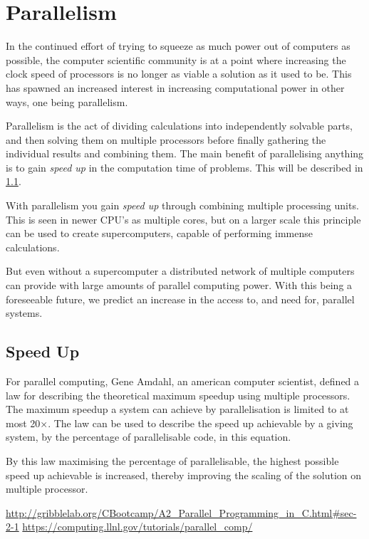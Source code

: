 \section{Parallelism}\label{sec:parallelism}

In the continued effort of trying to squeeze as much power out of computers as possible, the computer scientific community is at a point where increasing the clock speed of processors is no longer as viable a solution as it used to be. This has spawned an increased interest in increasing computational power in other ways, one being parallelism.

Parallelism is the act of dividing calculations into independently solvable parts, and then solving them on multiple processors before finally gathering the individual results and combining them. The main benefit of parallelising anything is to gain \emph{speed up} in the computation time of problems. This will be described in \cref{sup}.

With parallelism you gain \emph{speed up} through combining multiple processing units. This is seen in newer CPU's as multiple cores, but on a larger scale this principle can be used to create supercomputers, capable of performing immense calculations.

But even without a supercomputer a distributed network of multiple computers can provide with large amounts of parallel computing power. With this being a foreseeable future, we predict an increase in the access to, and need for, parallel systems.

\subsection{Speed Up}\label{sup}

For parallel computing, Gene Amdahl, an american computer scientist, defined a law for describing the theoretical maximum speedup using multiple processors. The maximum speedup a system can achieve by parallelisation is limited to at most 20×.
The law can be used to describe the speed up achievable by a giving system, by the percentage of parallelisable code, in this equation.

By this law maximising the percentage of parallelisable, the highest possible speed up achievable is increased, thereby improving the scaling of the solution on multiple processor.


\url{http://gribblelab.org/CBootcamp/A2_Parallel_Programming_in_C.html#sec-2-1}
\url{https://computing.llnl.gov/tutorials/parallel_comp/}

